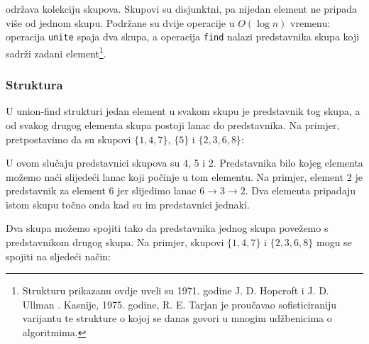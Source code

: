 
 održava
kolekciju skupova.
Skupovi su disjunktni, pa nijedan element
ne pripada više od jednom skupu.
Podržane su dvije operacije u $O(\log n)$ vremenu:
operacija \texttt{unite} spaja dva skupa,
a operacija \texttt{find} nalazi predstavnika
skupa koji sadrži zadani element\footnote{Strukturu prikazanu ovdje
uveli su 1971. godine J. D. Hopcroft i J. D. Ullman \cite{hop71}.
Kasnije, 1975. godine, R. E. Tarjan je proučavao sofisticiraniju varijantu
te strukture \cite{tar75} o kojoj se danas govori u mnogim
udžbenicima o algoritmima.}.

\subsubsection{Struktura}

U union-find strukturi jedan element u svakom skupu
je predstavnik tog skupa,
a od svakog drugog elementa skupa postoji lanac
do predstavnika.
Na primjer, pretpostavimo da su skupovi
$\{1,4,7\}$, $\{5\}$ i $\{2,3,6,8\}$:
\begin{center}
\end{center}
U ovom slučaju predstavnici
skupova su 4, 5 i 2.
Predstavnika bilo kojeg elementa možemo naći
slijedeći lanac koji počinje u tom elementu.
Na primjer, element 2 je predstavnik
za element 6 jer
slijedimo lanac $6 \rightarrow 3 \rightarrow 2$.
Dva elementa pripadaju istom skupu točno onda kad
su im predstavnici jednaki.

Dva skupa možemo spojiti tako da
predstavnika jednog skupa povežemo s
predstavnikom drugog skupa.
Na primjer, skupovi
$\{1,4,7\}$ i $\{2,3,6,8\}$
mogu se spojiti na sljedeći način:
\begin{center}
\end{center}

